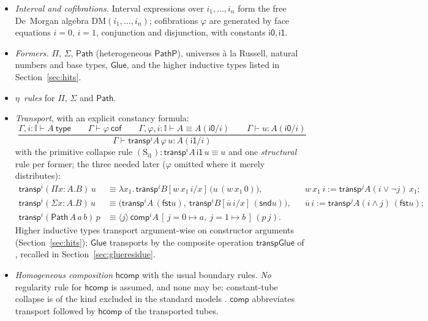 \documentclass{lmcs}
\newcommand{\I}{\mathbb{I}}
\newcommand{\DM}[1]{\mathrm{DM}(#1)}
\newcommand{\transp}{\mathsf{transp}}
\newcommand{\hcomp}{\mathsf{hcomp}}
\newcommand{\vcomp}{\mathsf{comp}}
\newcommand{\Glue}{\mathsf{Glue}}
\renewcommand{\conv}{\equiv}
\newcommand{\Path}{\mathsf{Path}}
\providecommand{\fst}{}\renewcommand{\fst}{\mathsf{fst}}
\providecommand{\snd}{}\renewcommand{\snd}{\mathsf{snd}}
\newcommand{\ii}{\mathsf{i1}}
\newcommand{\io}{\mathsf{i0}}
\begin{document}
\begin{itemize}
\item \emph{Interval and cofibrations.}  Interval expressions over
  $i_1,\dots,i_n$ form the free De~Morgan algebra
  $\DM{i_1,\dots,i_n}$; cofibrations $\varphi$ are generated by face
  equations $i{=}0$, $i{=}1$, conjunction and disjunction, with
  constants $\io, \ii$.
\item \emph{Formers.}  $\Pi$, $\Sigma$, $\Path$ (heterogeneous
  $\mathsf{PathP}$), universes \`a la Russell, natural numbers and
  base types, $\Glue$, and the higher inductive types listed in
  Section~\ref{sec:hits}.
\item \emph{$\eta$~rules} for $\Pi$, $\Sigma$ and $\Path$.
\item \emph{Transport}, with an explicit constancy formula:
  \[
    \frac{\Gamma, i : \I \vdash A\ \mathsf{type} \qquad
          \Gamma \vdash \varphi\ \mathsf{cof} \qquad
          \Gamma, \varphi, i : \I \vdash A \conv A(\io/i) \qquad
          \Gamma \vdash u : A(\io/i)}
         {\Gamma \vdash \transp^i A\,\varphi\,u : A(\ii/i)}
  \]
  with the primitive collapse rule
  $(\mathrm{S}_{\ii})\colon \transp^i A\,\ii\,u \conv u$ and one
  \emph{structural} rule per former; the three needed later
  ($\varphi$ omitted where it merely distributes):
  \begin{align*}
    \transp^i (\Pi x{:}A.B)\,u &\conv
      \lambda x_1.\, \transp^i B[w\,x_1\,i/x]\,
        \bigl(u\,(w\,x_1\,0)\bigr),
      && w\,x_1\,i := \transp^j A(i \vee \neg j)\,x_1;\\
    \transp^i (\Sigma x{:}A.B)\,u &\conv
      \bigl(\transp^i A\,(\fst u),\
            \transp^i B[\overline{u}\,i/x]\,(\snd u)\bigr),
      && \overline{u}\,i := \transp^j A(i \wedge j)\,(\fst u);\\
    \transp^i (\Path\,A\,a\,b)\,p &\conv
      \langle j \rangle\, \vcomp^i A\,
        [\,j{=}0 \mapsto a,\ j{=}1 \mapsto b\,]\,(p\,j).
  \end{align*}
  Higher inductive types transport argument-wise on constructor
  arguments (Section~\ref{sec:hits}); $\Glue$ transports by the
  composite operation $\mathsf{transpGlue}$ of \cite[\S6.2]{CCHM},
  recalled in Section~\ref{sec:glueresidue}.
\item \emph{Homogeneous composition} $\hcomp$ with the usual boundary
  rules.  \emph{No} regularity rule for $\hcomp$ is assumed, and none
  may be: constant-tube collapse is of the kind excluded in the
  standard models \cite{SwanRegularity,SattlerNote}.  $\vcomp$
  abbreviates transport followed by $\hcomp$ of the transported
  tubes.
\end{itemize}
\end{document}
